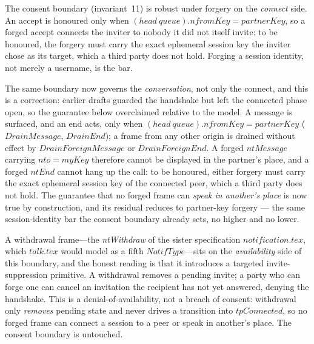 \documentclass[a4paper,10pt,fleqn]{article}
\begin{document}
The consent boundary (invariant~11) is robust under forgery on the
\emph{connect} side.  An accept is honoured only when
$(head~queue).nfromKey = partnerKey$, so a forged accept connects the inviter
to nobody it did not itself invite: to be honoured, the forgery must carry
the exact ephemeral session key the inviter chose as its target, which a
third party does not hold.  Forging a session identity, not merely a
username, is the bar.

The same boundary now governs the \emph{conversation}, not only the
connect, and this is a correction: earlier drafts guarded the
handshake but left the connected phase open, so the guarantee below
overclaimed relative to the model.  A message is surfaced, and an end
acts, only when $(head~queue).nfromKey = partnerKey$ ($DrainMessage$,
$DrainEnd$); a frame from any other origin is drained without effect
by $DrainForeignMessage$ or $DrainForeignEnd$.  A forged $ntMessage$
carrying $nto = myKey$ therefore cannot be displayed in the partner's
place, and a forged $ntEnd$ cannot hang up the call: to be honoured,
either forgery must carry the exact ephemeral session key of the
connected peer, which a third party does not hold.  The guarantee that
no forged frame can \emph{speak in another's place} is now true by
construction, and its residual reduces to partner-key forgery --- the
same session-identity bar the consent boundary already sets, no higher
and no lower.

A withdrawal frame---the \emph{ntWithdraw} of the sister specification
$notification.tex$, which $talk.tex$ would model as a fifth $NotifType$---sits
on the \emph{availability} side of this boundary, and the honest reading is
that it introduces a targeted invite-suppression primitive.  A withdrawal
removes a pending invite; a party who can forge one can cancel an invitation
the recipient has not yet answered, denying the handshake.  This is a
denial-of-availability, not a breach of consent: withdrawal only \emph{removes}
pending state and never drives a transition into $tpConnected$, so no forged
frame can connect a session to a peer or speak in another's place.  The
consent boundary is untouched.
\end{document}
